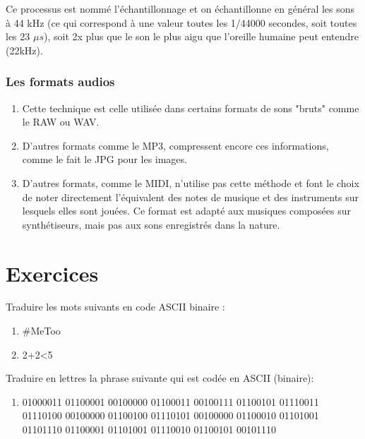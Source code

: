 \documentclass[11pt, a4paper]{book}
\begin{document}
Ce processus est nommé l'échantillonnage et on échantillonne en général les sons à 44 kHz (ce qui correspond à une valeur toutes les 1/44000 secondes, soit toutes les 23 $\mu s$), soit 2x plus que le son le plus aigu que l'oreille humaine peut entendre (22kHz).

\subsubsection{Les formats audios}
\begin{enumerate}
\item Cette technique est celle utilisée dans certains formats de sons "bruts" comme le RAW ou WAV. 

\item D'autres formats comme le MP3, compressent encore ces informations, comme le fait le JPG pour les images.

\item D'autres formats, comme le MIDI, n'utilise pas cette méthode et font le choix de noter directement l'équivalent des notes de musique et des instruments sur lesquels elles sont jouées. Ce format est adapté aux musiques composées sur synthétiseurs, mais pas aux sons enregistrés dans la nature.

\end{enumerate}

\section{Exercices}


\iffalse   %
\begin{exercice}
Traduire les mots suivants en code ASCII binaire :
\begin{enumerate}
\item \#MeToo
\item 2+2<5
\end{enumerate}
\end{exercice}

\begin{exercice}
Traduire en lettres la phrase suivante qui est codée en ASCII (binaire):
\begin{enumerate}
\item 01000011 01100001 00100000 01100011 00100111 01100101 01110011 01110100 00100000 01100100 01110101 00100000 01100010 01101001 01101110 01100001 01101001 01110010 01100101 00101110
\end{enumerate}
\end{exercice}
\end{document}
